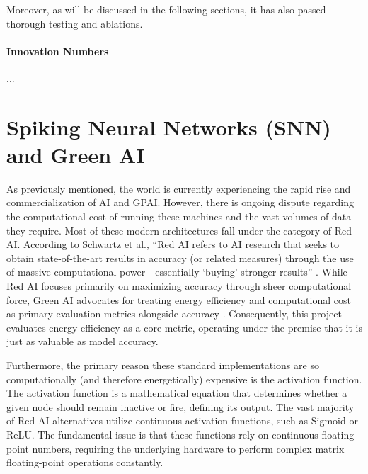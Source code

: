 Moreover, as will be discussed in the following sections, it has also passed thorough testing and ablations.

\paragraph{Innovation Numbers}
...



\section{Spiking Neural Networks (SNN) and Green AI}

As previously mentioned, the world is currently experiencing the rapid rise and commercialization of AI and GPAI. However, there is ongoing dispute regarding the computational cost of running these machines and the vast volumes of data they require. Most of these modern architectures fall under the category of Red AI. According to Schwartz et al., ``Red AI refers to AI research that seeks to obtain state-of-the-art results in accuracy (or related measures) through the use of massive computational power---essentially `buying' stronger results'' \cite{schwartz2020green}. While Red AI focuses primarily on maximizing accuracy through sheer computational force, Green AI advocates for treating energy efficiency and computational cost as primary evaluation metrics alongside accuracy \cite{schwartz2020green}. Consequently, this project evaluates energy efficiency as a core metric, operating under the premise that it is just as valuable as model accuracy.

Furthermore, the primary reason these standard implementations are so computationally (and therefore energetically) expensive is the activation function. The activation function is a mathematical equation that determines whether a given node should remain inactive or fire, defining its output. The vast majority of Red AI alternatives utilize continuous activation functions, such as Sigmoid or ReLU. The fundamental issue is that these functions rely on continuous floating-point numbers, requiring the underlying hardware to perform complex matrix floating-point operations constantly.

